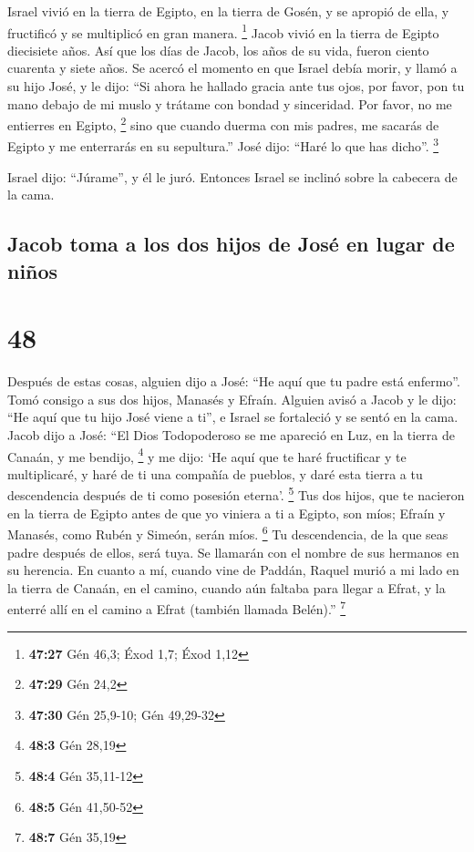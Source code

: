  Israel vivió en la tierra de Egipto, en la tierra de
Gosén, y se apropió de ella, y fructificó y se multiplicó en gran
manera. \footnote{\textbf{47:27} Gén 46,3; Éxod 1,7; Éxod 1,12}
 Jacob vivió en la tierra de Egipto diecisiete años. Así
que los días de Jacob, los años de su vida, fueron ciento cuarenta y
siete años.  Se acercó el momento en que Israel debía
morir, y llamó a su hijo José, y le dijo: ``Si ahora he hallado gracia
ante tus ojos, por favor, pon tu mano debajo de mi muslo y trátame con
bondad y sinceridad. Por favor, no me entierres en Egipto, \footnote{\textbf{47:29}
  Gén 24,2}  sino que cuando duerma con mis padres, me
sacarás de Egipto y me enterrarás en su sepultura.'' José dijo: ``Haré
lo que has dicho''. \footnote{\textbf{47:30} Gén 25,9-10; Gén 49,29-32}

 Israel dijo: ``Júrame'', y él le juró. Entonces Israel
se inclinó sobre la cabecera de la cama.

\hypertarget{jacob-toma-a-los-dos-hijos-de-josuxe9-en-lugar-de-niuxf1os}{%
\subsection{Jacob toma a los dos hijos de José en lugar de
niños}\label{jacob-toma-a-los-dos-hijos-de-josuxe9-en-lugar-de-niuxf1os}}

\hypertarget{section-47}{%
\section{48}\label{section-47}}

 Después de estas cosas, alguien dijo a José: ``He aquí
que tu padre está enfermo''. Tomó consigo a sus dos hijos, Manasés y
Efraín.  Alguien avisó a Jacob y le dijo: ``He aquí que tu
hijo José viene a ti'', e Israel se fortaleció y se sentó en la cama.
 Jacob dijo a José: ``El Dios Todopoderoso se me apareció
en Luz, en la tierra de Canaán, y me bendijo, \footnote{\textbf{48:3}
  Gén 28,19}  y me dijo: `He aquí que te haré fructificar
y te multiplicaré, y haré de ti una compañía de pueblos, y daré esta
tierra a tu descendencia después de ti como posesión eterna'.
\footnote{\textbf{48:4} Gén 35,11-12}  Tus dos hijos, que
te nacieron en la tierra de Egipto antes de que yo viniera a ti a
Egipto, son míos; Efraín y Manasés, como Rubén y Simeón, serán míos.
\footnote{\textbf{48:5} Gén 41,50-52}  Tu descendencia, de
la que seas padre después de ellos, será tuya. Se llamarán con el nombre
de sus hermanos en su herencia.  En cuanto a mí, cuando
vine de Paddán, Raquel murió a mi lado en la tierra de Canaán, en el
camino, cuando aún faltaba para llegar a Efrat, y la enterré allí en el
camino a Efrat (también llamada Belén).'' \footnote{\textbf{48:7} Gén
  35,19}

